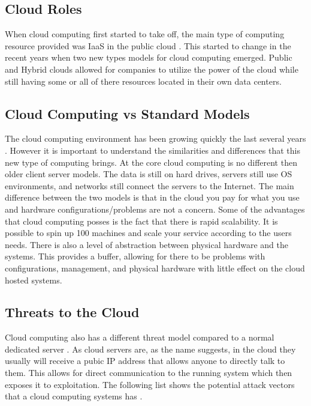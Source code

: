 \documentclass[12pt]{article}
\begin{document}
\subsection{Cloud Roles}
When cloud computing first started to take off, the main type of computing resource provided was IaaS in the public cloud \cite{sourcedigit}. This started to change in the recent years when two new types models for cloud computing emerged. Public and Hybrid clouds allowed for companies to utilize the power of the cloud while still having some or all of there resources located in their own data centers.

\subsection{Cloud Computing vs Standard Models}
The cloud computing environment has been growing quickly the last several years \cite{Vaquero}. However it is important to understand the similarities and differences that this new type of computing brings. At the core cloud computing is no different then older client server models. The data is still on hard drives, servers still use OS environments, and networks still connect the servers to the Internet. The main difference between the two models is that in the cloud you pay for what you use and hardware configurations/problems are not a concern. Some of the advantages that cloud computing posses is the fact that there is rapid scalability. It is possible to spin up 100 machines and scale your service according to the users needs. There is also a level of abstraction between physical hardware and the systems. This provides a buffer, allowing for there to be problems with configurations, management, and physical hardware with little effect on the cloud hosted systems.

\subsection{Threats to the Cloud}
Cloud computing also has a different threat model compared to a normal dedicated server \cite{zissis2012addressing, mishra2013cloud, krutz2010cloud}. As cloud servers are, as the name suggests, in the cloud they usually will receive a pubic IP address that allows anyone to directly talk to them. This allows for direct communication to the running system which then exposes it to exploitation. The following list shows the potential attack vectors that a cloud computing systems has \cite{amini2015threat}.
\end{document}
